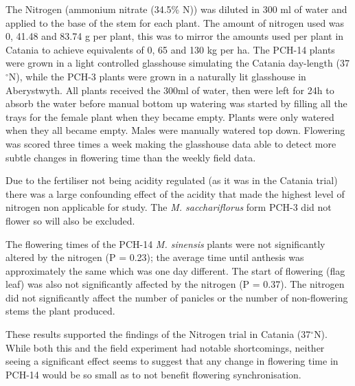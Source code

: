 \documentclass[fleqn, 15pt, lineno]{olplainarticle}
\begin{document}
The Nitrogen (ammonium nitrate (34.5\% N)) was diluted in 300 ml of water and applied to the base of the stem for each plant.
The amount of nitrogen used was 0, 41.48 and 83.74 g per plant, this was to mirror the amounts used per plant in Catania to achieve equivalents of 0, 65 and 130 kg per ha.
The PCH-14 plants were grown in a light controlled glasshouse simulating the Catania day-length (37$^{\circ}$N), while the PCH-3 plants were grown in a naturally lit glasshouse in Aberystwyth.
All plants received the 300ml of water, then were left for 24h to absorb the water before manual bottom up watering was started by filling all the trays for the female plant when they became empty.
Plants were only watered when they all became empty.
Males were manually watered top down.
Flowering was scored three times a week making the glasshouse data able to detect more subtle changes in flowering time than the weekly field data.

Due to the fertiliser not being acidity regulated (as it was in the Catania trial) there was a large confounding effect of the acidity that made the highest level of nitrogen non applicable for study.
The \textit{M. sacchariflorus} form PCH-3 did not flower so will also be excluded.

The flowering times of the PCH-14 \textit{M. sinensis} plants were not significantly altered by the nitrogen (P = 0.23); the average time until anthesis was approximately the same which was one day different.
The start of flowering (flag leaf) was also not significantly affected by the nitrogen (P = 0.37).
The nitrogen did not significantly affect the number of panicles or the number of non-flowering stems the plant produced.

These results supported the findings of the Nitrogen trial in Catania (37$^{\circ}$N).
While both this and the field experiment had notable shortcomings, neither seeing a significant effect seems to suggest that any change in flowering time in PCH-14 would be so small as to not benefit flowering synchronisation.



\FloatBarrier
\end{document}
